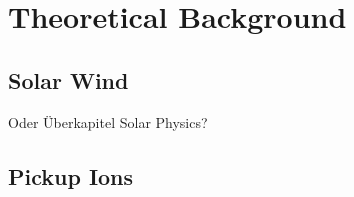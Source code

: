
\chapter{Theoretical Background} %

\label{Chapter1} %





\section{Solar Wind}

Oder Überkapitel Solar Physics?

\section{Pickup Ions}
